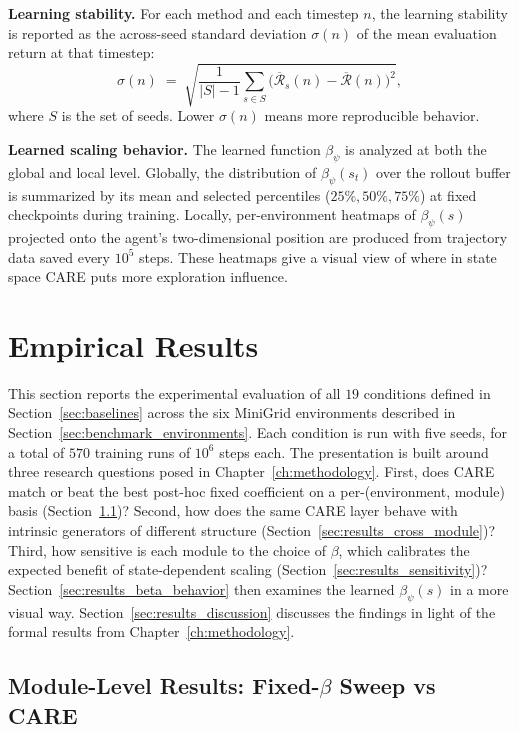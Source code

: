 \textbf{Learning stability.} For each method and each timestep $n$, the learning stability is reported as the across-seed standard deviation $\sigma(n)$ of the mean evaluation return at that timestep:
\begin{equation*}
\sigma(n) \;=\; \sqrt{\frac{1}{|S| - 1} \sum_{s \in S} \bigl( \overline{\mathcal{R}}_s(n) - \overline{\mathcal{R}}(n) \bigr)^2},
\end{equation*}
where $S$ is the set of seeds. Lower $\sigma(n)$ means more reproducible behavior.

\textbf{Learned scaling behavior.} The learned function $\beta_\psi$ is analyzed at both the global and local level. Globally, the distribution of $\beta_\psi(s_t)$ over the rollout buffer is summarized by its mean and selected percentiles ($25\%, 50\%, 75\%$) at fixed checkpoints during training. Locally, per-environment heatmaps of $\beta_\psi(s)$ projected onto the agent's two-dimensional position are produced from trajectory data saved every $10^5$ steps. These heatmaps give a visual view of where in state space CARE puts more exploration influence.

\section{Empirical Results}
\label{sec:empirical_results}

This section reports the experimental evaluation of all $19$ conditions defined in Section~\ref{sec:baselines} across the six MiniGrid environments described in Section~\ref{sec:benchmark_environments}. Each condition is run with five seeds, for a total of $570$ training runs of $10^6$ steps each. The presentation is built around three research questions posed in Chapter~\ref{ch:methodology}. First, does CARE match or beat the best post-hoc fixed coefficient on a per-(environment, module) basis (Section~\ref{sec:results_module_level})? Second, how does the same CARE layer behave with intrinsic generators of different structure (Section~\ref{sec:results_cross_module})? Third, how sensitive is each module to the choice of $\beta$, which calibrates the expected benefit of state-dependent scaling (Section~\ref{sec:results_sensitivity})? Section~\ref{sec:results_beta_behavior} then examines the learned $\beta_\psi(s)$ in a more visual way. Section~\ref{sec:results_discussion} discusses the findings in light of the formal results from Chapter~\ref{ch:methodology}.

\subsection{Module-Level Results: Fixed-\texorpdfstring{$\beta$}{beta} Sweep vs CARE}
\label{sec:results_module_level}

